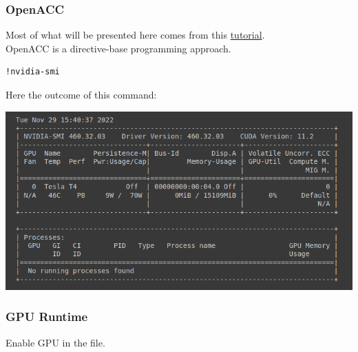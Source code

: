\documentclass[10pt,a4paper]{article}
\begin{document}
\subsubsection{OpenACC}
Most of what will be presented here comes from this \href{https://colab.research.google.com/github/ENCCS/OpenACC-CUDA-beginners/blob/colab_gcc/examples/openACC_CUDA_colab.ipynb}{tutorial}.\\
OpenACC is a directive-base programming approach.
\begin{lstlisting}
!nvidia-smi
\end{lstlisting}
Here the outcome of this command:
\begin{center}
\includegraphics[scale=0.8]{nvidiasmi.png}
\end{center}

\subsubsection{GPU Runtime}
Enable GPU in the file.
\end{document}
